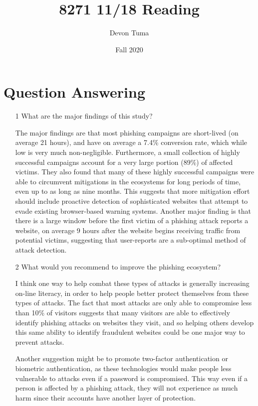 \documentclass[11pt]{article}
\title{8271 11/18 Reading}
\author{Devon Tuma}
\date{Fall 2020}
\begin{document}
\maketitle

\section*{Question Answering}

\begin{itemize}
\item [1] What are the major findings of this study?

  The major findings are that most phishing campaigns are short-lived (on average 21 hours), and have on average a 7.4\% conversion rate, which while low is very much non-negligible.
  Furthermore, a small collection of highly successful campaigns account for a very large portion (89\%) of affected victims.
  They also found that many of these highly successful campaigns were able to circumvent mitigations in the ecosystems for long periods of time, even up to as long as nine months.
  This suggests that more mitigation effort should include proactive detection of sophisticated websites that attempt to evade existing browser-based warning systems.
  Another major finding is that there is a large window before the first victim of a phishing attack reports a website, on average 9 hours after the website begins receiving traffic from potential victims, suggesting that user-reports are a sub-optimal method of attack detection.
  
\item [2] What would you recommend to improve the phishing ecosystem?

  I think one way to help combat these types of attacks is generally increasing on-line literacy, in order to help people better protect themselves from these types of attacks.
  The fact that most attacks are only able to compromise less than 10\% of visitors suggests that many visitors are able to effectively identify phishing attacks on websites they visit, and so helping others develop this same ability to identify fraudulent websites could be one major way to prevent attacks.

  Another suggestion might be to promote two-factor authentication or biometric authentication, as these technologies would make people less vulnerable to attacks even if a password is compromised.
  This way even if a person is affected by a phishing attack, they will not experience as much harm since their accounts have another layer of protection. 
  
\end{itemize}
\end{document}
